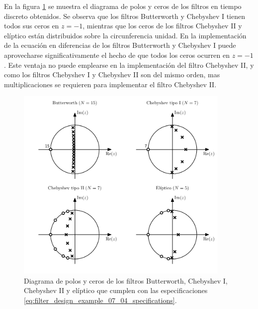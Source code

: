 \documentclass[a4paper]{report}
\begin{document}
En la figura \ref{fig:filter_design_example_07_04_pole_zero} se muestra el diagrama de polos  y ceros de los filtros en tiempo discreto obtenidos. Se observa que los filtros Butterworth y Chebyshev I tienen todos sus ceros en \(z=-1\), mientras que los ceros de los filtros Chebyshev II y elíptico están distribuidos sobre la circunferencia unidad. En la implementación de la ecuación en diferencias de los filtros Butterworth y Chebyshev I puede aprovecharse significativamente el hecho de que todos los ceros ocurren en \(z=-1\). Este ventaja no puede emplearse en la implementación del filtro Chebyshev II, y como los filtros Chebyshev I y Chebyshev II son del mismo orden, mas multiplicaciones se requieren para implementar el filtro Chebyshev II.
\begin{figure}[!htb]
 \begin{center}
 \includegraphics[width=0.92\textwidth]{figuras/filter_design_example_07_04_pole_zero.pdf}
 \caption{\label{fig:filter_design_example_07_04_pole_zero} Diagrama de polos y ceros de los filtros Butterworth, Chebyshev I, Chebyshev II y elíptico que cumplen con las especificaciones \ref{eq:filter_design_example_07_04_specifications}.}
 \end{center}
\end{figure}
\end{document}
